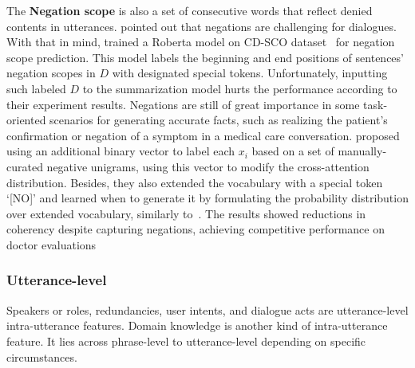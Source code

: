 The \textbf{Negation scope} is also a set of consecutive words that 
reflect denied contents in utterances. \citet{chen2020multi} pointed out that negations are challenging for dialogues. With that in mind, \citet{khalifa2021bag} trained a Roberta model on CD-SCO dataset~\cite{morante2012sem} for negation scope prediction. This model labels the beginning and end positions of sentences' negation scopes in $D$ with designated special tokens. Unfortunately, inputting such labeled $D$ to the summarization model hurts the performance according to their experiment results. Negations are still of great importance in some task-oriented scenarios for generating accurate facts, such as realizing the patient's confirmation or negation of a symptom in a medical care conversation. \citet{joshi2020dr} proposed using an additional binary vector to label each $x_i$ based on a set of manually-curated negative unigrams, using this vector to modify the cross-attention distribution. Besides, they also extended the vocabulary with a special token `[NO]' and 
learned when to generate it by formulating the probability distribution over extended vocabulary, similarly to~\citet{see2017get}. The results showed reductions in coherency despite capturing negations, achieving competitive performance on doctor evaluations


\subsubsection{Utterance-level}
Speakers or roles, redundancies, user intents, and dialogue acts are utterance-level intra-utterance features. 
Domain knowledge is another kind of intra-utterance feature. It lies across phrase-level to utterance-level depending on specific circumstances. 

